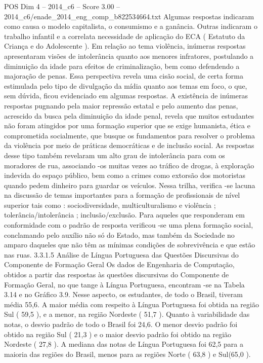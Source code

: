\begin{textsample}{POS Dim 4 – 2014\_c6 – Score 3.00 – 2014\_c6/enade\_2014\_eng\_comp\_b822534664.txt}
Algumas respostas indicaram como causa o modelo capitalista, o consumismo e a ganância.
Outras indicaram o trabalho infantil e a correlata necessidade de aplicação do ECA ( Estatuto da Criança e do Adolescente ).
Em relação ao tema violência, inúmeras respostas apresentaram visões de intolerância quanto aos menores infratores, postulando a diminuição da idade para efeitos de criminalização, bem como defendendo a majoração de penas.
Essa perspectiva revela uma cisão social, de certa forma estimulada pelo tipo de divulgação da mídia quanto aos temas em foco, o que, sem dúvida, ficou evidenciado em algumas respostas.
A existência de inúmeras respostas pugnando pela maior repressão estatal e pelo aumento das penas, acrescido da busca pela diminuição da idade penal, revela que muitos estudantes não foram atingidos por uma formação superior que se exige humanista, ética e comprometida socialmente, que busque os fundamentos para resolver o problema da violência por meio de práticas democráticas e de inclusão social.
As respostas desse tipo também revelaram um alto grau de intolerância para com os moradores de rua, associando -os muitas vezes ao tráfico de drogas, à exploração indevida do espaço público, bem como a crimes como extorsão dos motoristas quando pedem dinheiro para guardar os veículos.
Nessa trilha, verifica -se lacuna na discussão de temas importantes para a formação de profissionais de nível superior tais como : sociodiversidade, multiculturalismo e violência ; tolerância/intolerância ; inclusão/exclusão.
Para aqueles que responderam em conformidade com o padrão de resposta verificou -se uma plena formação social, conclamando pelo auxílio não só do Estado, mas também da Sociedade no amparo daqueles que não têm as mínimas condições de sobrevivência e que estão nas ruas. 3.3.1.5 Análise de Língua Portuguesa das Questões Discursivas do Componente de Formação Geral Os dados de Engenharia de Computação, obtidos a partir das respostas às questões discursivas do Componente de Formação Geral, no que tange à Língua Portuguesa, encontram -se na Tabela 3.14 e no Gráfico 3.9.
Nesse aspecto, os estudantes, de todo o Brasil, tiveram média 55,6.
A maior média com respeito à Língua Portuguesa foi obtida na região Sul ( 59,5 ), e a menor, na região Nordeste ( 51,7 ).
Quanto à variabilidade das notas, o desvio padrão de todo o Brasil foi 24,6.
O menor desvio padrão foi obtido na região Sul ( 21,3 ) e o maior desvio padrão foi obtido na região Nordeste ( 27,8 ).
A mediana das notas de Língua Portuguesa foi 62,5 para a maioria das regiões do Brasil, menos para as regiões Norte ( 63,8 ) e Sul(65,0 ).

\end{textsample}
